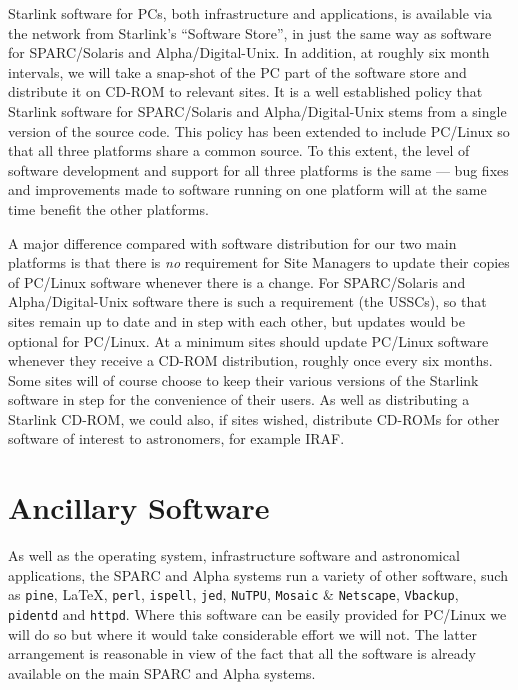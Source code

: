 \documentclass[twoside,11pt]{article}
\newcommand{\htmladdnormallink}[2]{#1}
\begin{document}
Starlink software for PCs, both infrastructure and
applications, is available via the
network from Starlink's ``Software Store'', in just the same way as
software for SPARC/Solaris and Alpha/Digital-Unix.  In addition, at
roughly six month intervals, we will take a snap-shot of the PC
part of the software store and distribute it on CD-ROM to relevant
sites.  It is a well established policy that Starlink software for
SPARC/Solaris and Alpha/Digital-Unix stems from a single version of the
source code.  This policy has been extended to include
PC/Linux so that all three platforms share a common source.  To
this extent, the level of software development and support for all
three platforms is the same --- bug fixes and improvements made
to software running on one platform will at the same time benefit the
other platforms.

A major difference compared with software distribution for our two main
platforms is that there is {\em no} requirement for Site Managers to
update their copies of PC/Linux software whenever there is a change.
For SPARC/Solaris and Alpha/Digital-Unix software there is such a
requirement (the USSCs), so that sites remain up to date and in step
with each other,  but updates would be optional for PC/Linux.  
At a minimum sites should update PC/Linux software
whenever they receive a CD-ROM distribution, roughly once every six
months. Some sites will of course choose to keep their various versions of
the Starlink software in step for the convenience of their users.
As well as distributing a Starlink CD-ROM, we could also, if
sites wished, distribute CD-ROMs for other software of interest to
astronomers, for example IRAF.


\section{Ancillary Software}

As well as the operating system, infrastructure software and
astronomical applications, the SPARC and Alpha systems run a variety of
other software, such as 
\htmladdnormallink{{\tt pine}}{http://www.washington.edu/pine/}, \LaTeX, 
\htmladdnormallink{{\tt perl}}{http://www.perl.com/}, 
\htmladdnormallink{{\tt ispell}}{http://www.gnu.org/software/ispell/ispell.html}, 
\htmladdnormallink{{\tt jed}}{http://www.jedsoft.org/jed/},
\htmladdnormallink{{\tt NuTPU}}{http://www.asoft-dev.com/}, 
{\tt Mosaic} \& {\tt Netscape}, 
\htmladdnormallink{{\tt Vbackup}}{http://www.bosbc.com/brvback.htm}, 
{\tt pidentd} and {\tt httpd}.  
Where this software can be easily provided for PC/Linux
we will do so but where it would take considerable effort we will
not.  The latter arrangement is reasonable in view of the fact that all
the software is already available on the main SPARC and Alpha systems.
\end{document}

